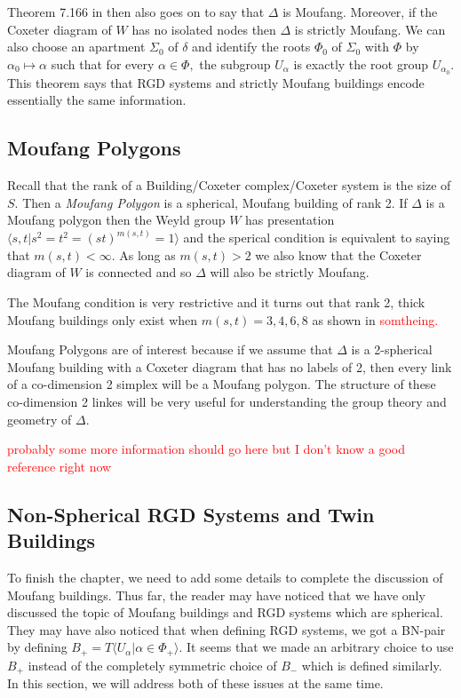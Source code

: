 \documentclass[class=book, crop=false,12 pt]{standalone}
\begin{document}
Theorem 7.166 in \cite{buildings} then also goes on to say that $\Delta$ is Moufang. Moreover, if the Coxeter diagram of $W$ has no isolated nodes then $\Delta$ is strictly Moufang. We can also choose an apartment $\Sigma_0$ of $\delta$ and identify the roots $\Phi_0$ of $\Sigma_0$ with $\Phi$ by $\alpha_0\mapsto \alpha$ such that for every $\alpha\in \Phi,$ the subgroup $U_\alpha$ is exactly the root group $U_{\alpha_0}.$ This theorem says that RGD systems and strictly Moufang buildings encode essentially the same information.

\subsection{Moufang Polygons}
Recall that the rank of a Building/Coxeter complex/Coxeter system is the size of $S.$ Then a \emph{Moufang Polygon} is a spherical, Moufang building of rank 2. If $\Delta$ is a Moufang polygon then the Weyld group $W$ has presentation $\langle s,t|s^2=t^2=(st)^{m(s,t)}=1\rangle$ and the sperical condition is equivalent to saying that $m(s,t)<\infty.$ As long as $m(s,t)>2$ we also know that the Coxeter diagram of $W$ is connected and so $\Delta$ will also be strictly Moufang. 

The Moufang condition is very restrictive and it turns out that rank 2, thick Moufang buildings only exist when $m(s,t)=3,4,6,8$ as shown in \textcolor{red}{somtheing.} 

Moufang Polygons are of interest because if we assume that $\Delta$ is a 2-spherical Moufang building with a Coxeter diagram that has no labels of 2, then every link of a co-dimension 2 simplex will be a Moufang polygon. The structure of these co-dimension 2 linkes will be very useful for understanding the group theory and geometry of $\Delta.$

\textcolor{red}{probably some more information should go here but I don't know a good reference right now}

\subsection{Non-Spherical RGD Systems and Twin Buildings}
To finish the chapter, we need to add some details to complete the discussion of Moufang buildings. Thus far, the reader may have noticed that we have only discussed the topic of Moufang buildings and RGD systems which are spherical. They may have also noticed that when defining RGD systems, we got a BN-pair by defining $B_+=T\langle U_\alpha|\alpha\in \Phi_+\rangle.$ It seems that we made an arbitrary choice to use $B_+$ instead of the completely symmetric choice of $B_-$ which is defined similarly. In this section, we will address both of these issues at the same time.
\end{document}
